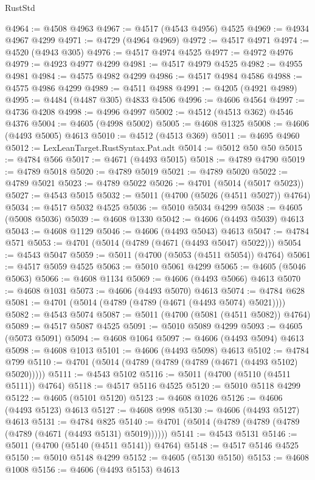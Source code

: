 \begin{lexlean}{RustStd}
\begin{coremodule}
@4964 := @4508 @4963
@4967 := @4517 (@4543 @4956) @4525
@4969 := @4934 @4967 @4299
@4971 := @4729 (@4964 @4969)
@4972 := @4517 @4971
@4974 := @4520 (@4943 @305)
@4976 := @4517 @4974 @4525
@4977 := @4972 @4976
@4979 := @4923 @4977 @4299
@4981 := @4517 @4979 @4525
@4982 := @4955 @4981
@4984 := @4575 @4982 @4299
@4986 := @4517 @4984 @4586
@4988 := @4575 @4986 @4299
@4989 := @4511 @4988
@4991 := @4205 (@4921 @4989)
@4995 := @4484 (@4487 @305) @4833 @4506
@4996 := @4606 @4564
@4997 := @4736 @4208
@4998 := @4996 @4997
@5002 := @4512 (@4513 @362) @4546 @4376
@5004 := @4605 (@4998 @5002)
@5005 := @4608 @1325
@5008 := @4606 (@4493 @5005) @4613
@5010 := @4512 (@4513 @369)
@5011 := @4695 @4960
@5012 := LexLeanTarget.RustSyntax.Pat.adt
@5014 := @5012 @50 @50
@5015 := @4784 @566
@5017 := @4671 (@4493 @5015)
@5018 := @4789 @4790
@5019 := @4789 @5018
@5020 := @4789 @5019
@5021 := @4789 @5020
@5022 := @4789 @5021
@5023 := @4789 @5022
@5026 := @4701 (@5014 (@5017 @5023))
@5027 := @4543 @5015
@5032 := @5011 (@4700 (@5026 (@4511 @5027)) @4764)
@5034 := @4517 @5032 @4525
@5036 := @5010 @5034 @4299
@5038 := @4605 (@5008 @5036)
@5039 := @4608 @1330
@5042 := @4606 (@4493 @5039) @4613
@5043 := @4608 @1129
@5046 := @4606 (@4493 @5043) @4613
@5047 := @4784 @571
@5053 := @4701 (@5014 (@4789 (@4671 (@4493 @5047) @5022)))
@5054 := @4543 @5047
@5059 := @5011 (@4700 (@5053 (@4511 @5054)) @4764)
@5061 := @4517 @5059 @4525
@5063 := @5010 @5061 @4299
@5065 := @4605 (@5046 @5063)
@5066 := @4608 @1134
@5069 := @4606 (@4493 @5066) @4613
@5070 := @4608 @1031
@5073 := @4606 (@4493 @5070) @4613
@5074 := @4784 @628
@5081 := @4701 (@5014 (@4789 (@4789 (@4671 (@4493 @5074) @5021))))
@5082 := @4543 @5074
@5087 := @5011 (@4700 (@5081 (@4511 @5082)) @4764)
@5089 := @4517 @5087 @4525
@5091 := @5010 @5089 @4299
@5093 := @4605 (@5073 @5091)
@5094 := @4608 @1064
@5097 := @4606 (@4493 @5094) @4613
@5098 := @4608 @1013
@5101 := @4606 (@4493 @5098) @4613
@5102 := @4784 @799
@5110 := @4701 (@5014 (@4789 (@4789 (@4789 (@4671 (@4493 @5102) @5020)))))
@5111 := @4543 @5102
@5116 := @5011 (@4700 (@5110 (@4511 @5111)) @4764)
@5118 := @4517 @5116 @4525
@5120 := @5010 @5118 @4299
@5122 := @4605 (@5101 @5120)
@5123 := @4608 @1026
@5126 := @4606 (@4493 @5123) @4613
@5127 := @4608 @998
@5130 := @4606 (@4493 @5127) @4613
@5131 := @4784 @825
@5140 := @4701 (@5014 (@4789 (@4789 (@4789 (@4789 (@4671 (@4493 @5131) @5019))))))
@5141 := @4543 @5131
@5146 := @5011 (@4700 (@5140 (@4511 @5141)) @4764)
@5148 := @4517 @5146 @4525
@5150 := @5010 @5148 @4299
@5152 := @4605 (@5130 @5150)
@5153 := @4608 @1008
@5156 := @4606 (@4493 @5153) @4613

\end{coremodule}
\end{lexlean}
